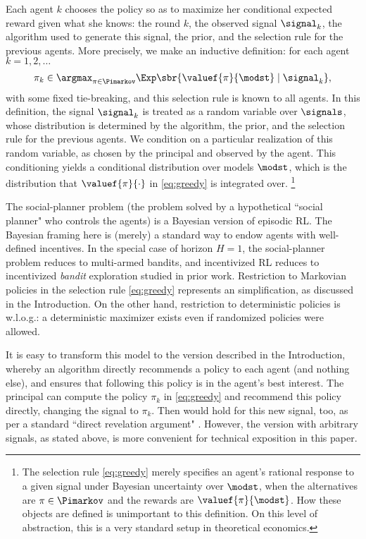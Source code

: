 Each agent $k$ chooses the policy so as to maximize her conditional expected reward given what she knows: the round $k$, the observed signal $\signal_k$, the algorithm used to generate this signal, the prior, and the selection rule for the previous agents. More precisely, we make an inductive definition: for each agent $k=1,2, \ldots$
\begin{align}\label{eq:greedy}
\pi_k \in \argmax_{\pi\in \Pimarkov}
    \Exp\sbr{ \valuef{\pi}{\modst} \mid \signal_k},
\end{align}
with some fixed tie-breaking, and this selection rule is known to all agents. In this definition, the signal $\signal_k$ is treated as a random variable over $\signals$, whose distribution is determined by the algorithm, the prior, and the selection rule for the previous agents. We condition on a particular realization of this random variable, as chosen by the principal and observed by the agent. This conditioning yields a conditional distribution over models $\modst$, which is the distribution that $\valuef{\pi}{\cdot}$ in \eqref{eq:greedy} is integrated over.
\footnote{The selection rule \eqref{eq:greedy} merely specifies an agent's rational response to a given signal under Bayesian uncertainty over $\modst$, when the alternatives are $\pi\in\Pimarkov$ and the rewards are $\valuef{\pi}{\modst}$. How these objects are defined is unimportant to this definition. On this level of abstraction, this is a very standard setup in theoretical economics.}

The social-planner problem (\ie the problem solved by a hypothetical ``social planner" who controls the agents) is a Bayesian version of episodic RL. The Bayesian framing here is (merely) a standard way to endow agents with well-defined incentives. In the special case of horizon $H=1$, the social-planner problem reduces to multi-armed bandits, and incentivized RL reduces to incentivized \emph{bandit} exploration studied in prior work. Restriction to Markovian policies in the selection rule \eqref{eq:greedy} represents an simplification, as discussed in the Introduction. On the other hand, restriction to deterministic policies is w.l.o.g.: a deterministic maximizer exists even if randomized policies were allowed.


\begin{remark}
It is easy to transform this model to the version described in the Introduction, whereby an algorithm directly recommends a policy to each agent (and nothing else), and ensures that following this policy is in the agent's best interest. The principal can compute the policy $\pi_k$ in \eqref{eq:greedy} and recommend this policy directly, changing the signal to $\pi_k$. Then  would hold for this new signal, too, as per a standard ``direct revelation argument" \citep{Kremer-JPE14}. However, the version with arbitrary signals, as stated above, is more convenient for technical exposition in this paper.
\end{remark}


